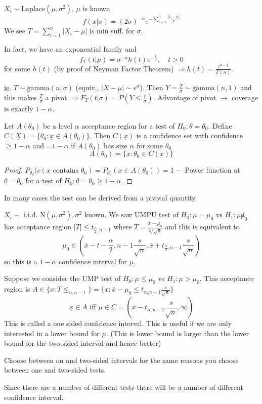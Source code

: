 \documentclass[english, 11pt]{article}
\newcommand{\lp}{\left(}
\newcommand{\rp}{\right)}
\begin{document}
\begin{exmp}
$X_i\sim\text{Laplace}(\mu, \sigma^2)$, $\mu$ is known
$$
f(\underline{x}|\sigma)=(2\sigma)^{-n}e^{-\sum_{i=1}^n\frac{|x_i-\mu|}{\sigma}}
$$
We see $T=\sum_{i=1}^n|X_i-\mu|$ is min suff. for $\sigma$.

In fact, we have an exponential family and 
$$
f_T(t|\mu)=\sigma^{-n}h(t)e^{-\frac{t}{\sigma}}, \quad t>0
$$
for some $h(t)$ (by proof of Neyman Factor Theorem) $\Rightarrow h(t)=\frac{t^{n-1}}{\Gamma(n)}$.

\underline{ie}. $T\sim\text{gamma}(n,\sigma)$ (equiv., $|X-\mu|\sim e^{\sigma}$). Then $Y=\frac{T}{\sigma}\sim\text{gamma}(n, 1)$ and this makes $\frac{T}{\sigma}$ a pivot $\Rightarrow F_T(t|\sigma)=P\lp Y\leqslant \frac{t}{\sigma}\rp$. Advantage of pivot $\to$ coverage is exactly $1-\alpha$.
\end{exmp}

\begin{thrm}\label{thrm:611}
Let $A(\theta_0)$ be a level $\alpha$ acceptance region for a test of $H_0:\theta=\theta_0$. Define $C(\underline{X})=\{\theta_0:\underline{x}\in A(\theta_0)\}$. Then $C(\underline{x})$ is a confidence set with confidence $\geqslant 1-\alpha$ and =$1-\alpha$ if $A(\theta_0)$ has size $\alpha$ for some $\theta_0$
$$
A(\theta_0)=\{x:\theta_0\in C(\underline{x})\}
$$
\end{thrm}
\begin{proof}
$P_{\theta_0}(c(\underline{x}\text{ contains }\theta_0)=P_{\theta_0}(\underline{x}\in A(\theta_0))=1-$ Power function at $\theta=\theta_0$ for a test of $H_0:\theta=\theta_0\geqslant 1-\alpha$.
\end{proof}


In many cases the test can be derived from a pivotal quantity.

\begin{exmp}
$X_i\sim \text{ i.i.d. N}(\mu, \sigma^2), \sigma^2$ known. We saw UMPU test of $H_0:\mu=\mu_0$ vs $H_1:\mu\not\mu_0$ has acceptance region $|T|\leqslant t_{\frac{\alpha}{2}, n-1}$ where $T=\frac{\bar{x}-\mu_0}{s/\sqrt{n}}$ and this is equivalent to
$$
\mu_0\in\lp\bar{x}-t-{\frac{\alpha}{2}, n-1}\frac{s}{\sqrt{n}}, \bar{x}+t_{\frac{\alpha}{2}, n-1}\frac{s}{\sqrt{n}}\rp
$$
so this is a $1-\alpha$ confidence interval for $\mu$.

Suppose we consider the UMP test of $H_0:\mu\leqslant\mu_0$ vs $H_1:\mu>\mu_0$. This acceptance region is $A\in\{x:T\leqslant_{\alpha, n-1}\}=\{x:\bar{x}-\mu_0\leqslant t_{\alpha, n-1}\frac{s}{\sqrt{n}}\}$
$$
\underline{x}\in A\text{ iff } \mu\in C=\lp\bar{x}-t_{\alpha, n-1}\frac{s}{\sqrt{n}}, \infty\rp
$$
This is called a one sided confidence interval. This is useful if we are only interested in a lower bound for $\mu$. (This is lower bound is larger than the lower bound for the two-sided interval and hence better)

Choose between on and two-sided intervals for the same reasons you choose between one and  two-sided tests.

Since there are a number of different tests there will be a number of different confidence interval.
\end{exmp}
\end{document}
